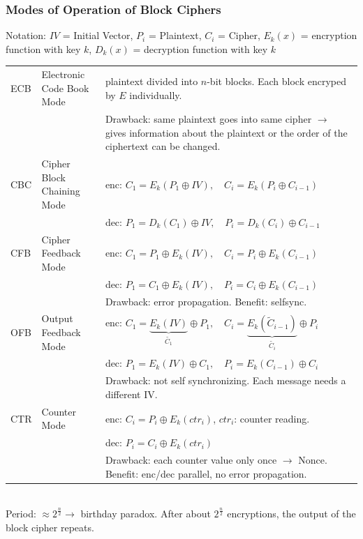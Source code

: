 \subsubsection{Modes of Operation of Block Ciphers}%
Notation: $IV$ = Initial Vector, $P_i$ = Plaintext, $C_i$ = Cipher, $E_k(x)$ = encryption function with key $k$, $D_k(x)$ = decryption function with key $k$\\
\begin{tabular}{|l l |p{12cm}|}
\hline
	ECB	&	Electronic Code Book Mode	&	plaintext divided into $n$-bit blocks. Each block encryped by $E$ individually. \\
		&								&	Drawback: same plaintext goes into same cipher $\to$ gives information about the plaintext or the order of the ciphertext can be changed.\\
\hline
	CBC	&	Cipher Block Chaining Mode	&	enc: $C_1=E_k(P_1 \oplus IV), \quad C_i=E_k(P_i \oplus C_{i-1})$ \\
		&								&	dec: $P_1=D_k(C_1) \oplus IV, \quad P_i=D_k(C_i) \oplus C_{i-1}$	\\	
\hline
	CFB &	Cipher Feedback Mode		& 	enc: $C_1=P_1 \oplus E_k(IV), \quad C_i=P_i \oplus E_k(C_{i-1})$\\
		&								&	dec: $P_1=C_1 \oplus E_k(IV), \quad P_i=C_i \oplus E_k(C_{i-1})$\\
		&								&	Drawback: error propagation. Benefit: selfsync.\\
\hline
	OFB	&	Output Feedback Mode		& 	enc: $C_1=\underbrace{E_k(IV)}_{\tilde{C_1}} \oplus P_1, \quad C_i=\underbrace{E_k(\tilde{C}_{i-1})}_{\tilde{C_i}} \oplus P_i $\\
		&								& 	dec: $P_1=E_k(IV) \oplus C_1, \quad P_i=E_k(C_{i-1}) \oplus C_i $\\
		&								&	Drawback: not self synchronizing. Each message needs a different IV.\\
\hline
	CTR	&	Counter Mode				& 	enc: $C_i=P_i \oplus E_k(ctr_i) $, $ctr_i$: counter reading.\\
		&								&	dec: $P_i=C_i \oplus E_k(ctr_i) $\\
		&               & Drawback: each counter value only once $\rightarrow$ Nonce. Benefit: enc/dec parallel, no error propagation.\\
\hline
\end{tabular}\\

Period: $\approx 2^{\frac{n}{2}} \to $ birthday paradox. After about $2^{\frac{n}{2}}$ encryptions, the output of the block cipher repeats.

